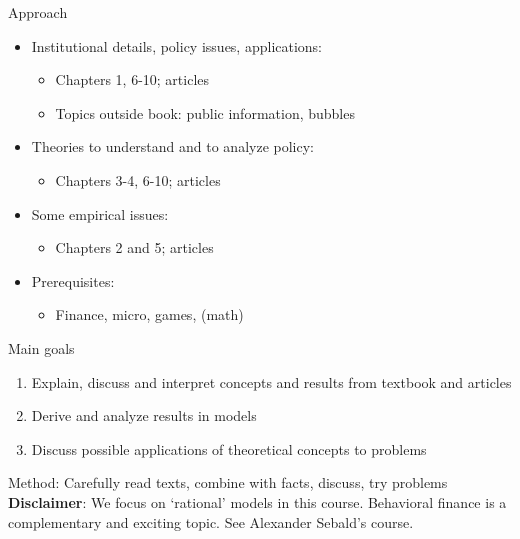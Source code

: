 \documentclass[english,10pt]{beamer}
\theoremstyle{definition}
\begin{document}
\begin{frame}{Approach}
\begin{itemize}
	\item Institutional details, policy issues, applications:
	\begin{itemize}
		\item Chapters 1, 6-10; articles
		\item Topics outside book: public information, bubbles
	\end{itemize}
	\item Theories to understand and to analyze policy:
	\begin{itemize}
		\item Chapters 3-4, 6-10; articles
	\end{itemize}
	\item Some empirical issues:
	\begin{itemize}
		\item Chapters 2 and 5; articles
	\end{itemize}
	\item Prerequisites:
	\begin{itemize}
		\item Finance, micro, games, (math)
	\end{itemize}
\end{itemize}
\end{frame}


\begin{frame}{Main goals}
\begin{enumerate}
	\item Explain, discuss and interpret concepts and results from textbook and articles
	\item Derive and analyze results in models
	\item Discuss possible applications of theoretical concepts to problems
\end{enumerate}
Method: Carefully read texts, combine with facts, discuss, try problems
\pause
\quad
\textbf{Disclaimer}: We focus on `rational' models in this course.
Behavioral finance is a complementary and exciting topic. See
Alexander Sebald's course.
\end{frame}
\end{document}

